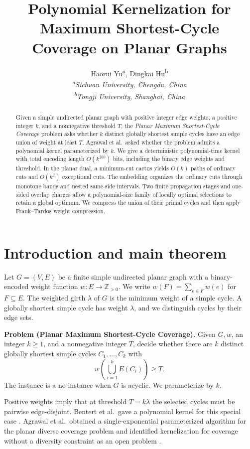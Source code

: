 \documentclass[10pt,letterpaper]{article}
\title{Polynomial Kernelization for Maximum Shortest-Cycle\\ Coverage on Planar Graphs}
\author{Haorui Yu\textsuperscript{a}, Dingkai Hu\textsuperscript{b}\\[0.55em]
  {\small\itshape\textsuperscript{a}Sichuan University, Chengdu, China}\\[-0.12em]
  {\small\itshape\textsuperscript{b}Tongji University, Shanghai, China}}
\date{}
\begin{document}
\maketitle
\begin{abstract}
Given a simple undirected planar graph with positive integer edge weights, a positive integer \(k\), and a nonnegative threshold \(T\), the \emph{Planar Maximum Shortest-Cycle Coverage} problem asks whether \(k\) distinct globally shortest simple cycles have an edge union of weight at least \(T\). Agrawal et al.\ asked whether the problem admits a polynomial kernel parameterized by \(k\). We give a deterministic polynomial-time kernel with total encoding length \(O(k^{200})\) bits, including the binary edge weights and threshold. In the planar dual, a minimum-cut cactus yields \(O(k)\) paths of ordinary cuts and \(O(k^2)\) exceptional cuts. The embedding organizes the ordinary cuts through monotone bands and nested same-side intervals. Two finite propagation stages and one-sided overlap charges allow a polynomial-size family of locally optimal selections to retain a global optimum. We compress the union of their primal cycles and then apply Frank--Tardos weight compression.
\end{abstract}

\section{Introduction and main theorem}
Let \(G=(V,E)\) be a finite simple undirected planar graph with a binary-encoded weight function \(w:E\to\mathbb Z_{>0}\). We write \(w(F)=\sum_{e\in F}w(e)\) for \(F\subseteq E\). The weighted girth \(\lambda\) of \(G\) is the minimum weight of a simple cycle. A globally shortest simple cycle has weight \(\lambda\), and we distinguish cycles by their edge sets.

\smallskip
\noindent\textbf{Problem (Planar Maximum Shortest-Cycle Coverage).}
Given \(G,w\), an integer \(k\ge 1\), and a nonnegative integer \(T\), decide whether there are \(k\) distinct globally shortest simple cycles \(C_1,\ldots,C_k\) with
\[
w\!\left(\bigcup_{i=1}^k E(C_i)\right)\ge T.
\]
The instance is a no-instance when \(G\) is acyclic. We parameterize by \(k\).

Positive weights imply that at threshold \(T=k\lambda\) the selected cycles must be pairwise edge-disjoint. Bentert et al.\ gave a polynomial kernel for this special case \cite{Bentert2025}. Agrawal et al.\ obtained a single-exponential parameterized algorithm for the planar diverse coverage problem and identified kernelization for coverage without a diversity constraint as an open problem \cite[Section~6]{Agrawal2026}.
\end{document}
